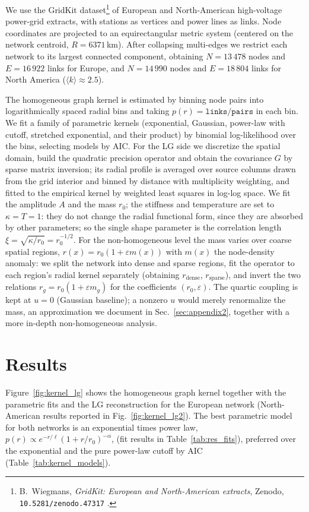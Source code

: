 We use the GridKit dataset\footnote{B.~Wiegmans, \emph{GridKit: European and North-American extracts},
Zenodo, \texttt{10.5281/zenodo.47317} \cite{gridkit2016}.} of European and North-American high-voltage
power-grid extracts, with
stations as vertices and power lines as links. Node coordinates are projected to an equirectangular metric
system (centered on the network centroid, $R=6371$\,km). After collapsing multi-edges we restrict each network
to its largest connected component, obtaining $N=13\,478$ nodes and $E=16\,922$ links for Europe, and
$N=14\,990$ nodes and $E=18\,804$ links for North America ($\langle k\rangle\approx2.5$).

\noindent The homogeneous graph kernel is estimated by binning node pairs into logarithmically spaced radial
bins and taking $p(r)=\texttt{links}/\texttt{pairs}$ in each bin. We fit a family of parametric kernels (exponential,
Gaussian, power-law with cutoff, stretched exponential, and their product) by binomial log-likelihood over the
bins, selecting models by AIC. 
For the LG side we discretize the spatial domain, build the quadratic precision operator and obtain the covariance 
$G$ by sparse matrix inversion; its radial profile is averaged over source columns drawn from the grid interior 
and binned by distance with multiplicity weighting, and fitted to the empirical kernel by weighted least squares 
in log-log space. We fit the amplitude $A$ and the mass $r_0$; the stiffness and temperature are set to $\kappa=T=1$: 
they do not change the radial functional form, since they are absorbed by other parameters; 
so the single shape parameter is the correlation length $\xi=\sqrt{\kappa/r_0}=r_0^{-1/2}$. 
For the non-homogeneous level the mass varies over coarse spatial regions, $r(x)=r_0(1+\varepsilon m(x))$ with $m(x)$ the node-density
anomaly: we split the network into dense and sparse regions, fit the operator to each region's radial kernel
separately (obtaining $r_{\text{dense}}$, $r_{\text{sparse}}$), and invert the two relations
$r_g=r_0(1+\varepsilon m_g)$ for the coefficients $(r_0,\varepsilon)$. The quartic coupling is kept at $u=0$
(Gaussian baseline); a nonzero $u$ would merely renormalize the mass, an approximation we document in Sec.~\ref{sec:appendix2}, 
together with a more in-depth non-homogeneous analysis.

\section{Results}

Figure~\ref{fig:kernel_lg} shows the homogeneous graph kernel together with the parametric fits and the LG
reconstruction for the European network (North-American results reported in Fig.~\ref{fig:kernel_lg2}). 
The best parametric model for both networks is an exponential times power law,
$p(r)\propto e^{-r/\ell}(1+r/r_0)^{-\alpha}$, (fit results in Table~\ref{tab:res_fits}),
preferred over the exponential and the pure power-law cutoff by AIC
(Table~\ref{tab:kernel_models}).

